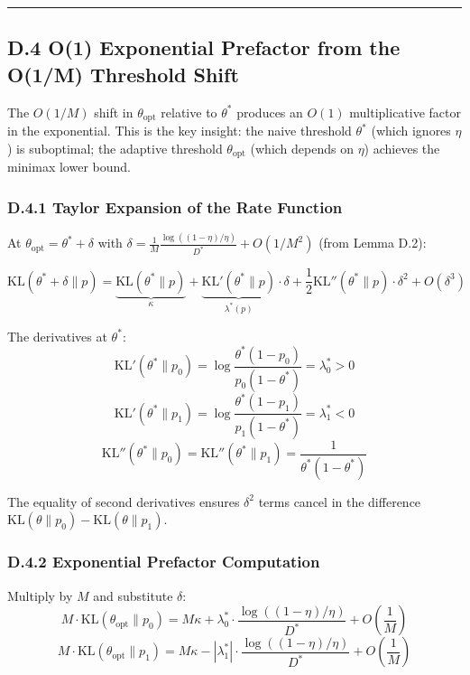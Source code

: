 \documentclass[
  12pt,
]{ctexart}
\begin{document}
\begin{center}\rule{0.5\linewidth}{0.5pt}\end{center}

\subsection{D.4 O(1) Exponential Prefactor from the O(1/M) Threshold
Shift}\label{d.4-o1-exponential-prefactor-from-the-o1m-threshold-shift}

The \(O(1/M)\) shift in \(\theta_{\text{opt}}\) relative to \(\theta^*\)
produces an \(O(1)\) multiplicative factor in the exponential. This is
the key insight: the naive threshold \(\theta^*\) (which ignores
\(\eta\)) is suboptimal; the adaptive threshold \(\theta_{\text{opt}}\)
(which depends on \(\eta\)) achieves the minimax lower bound.

\subsubsection{D.4.1 Taylor Expansion of the Rate
Function}\label{d.4.1-taylor-expansion-of-the-rate-function}

At \(\theta_{\text{opt}} = \theta^* + \delta\) with
\(\delta = \frac{1}{M}\frac{\log((1-\eta)/\eta)}{D^*} + O(1/M^2)\) (from
Lemma D.2):

\[\text{KL}(\theta^* + \delta \| p) = \underbrace{\text{KL}(\theta^* \| p)}_{\kappa} + \underbrace{\text{KL}'(\theta^* \| p)}_{\lambda^*(p)} \cdot \delta + \frac{1}{2}\text{KL}''(\theta^* \| p) \cdot \delta^2 + O(\delta^3)\]

The derivatives at \(\theta^*\):
\[\text{KL}'(\theta^* \| p_0) = \log\frac{\theta^*(1-p_0)}{p_0(1-\theta^*)} = \lambda_0^* > 0\]
\[\text{KL}'(\theta^* \| p_1) = \log\frac{\theta^*(1-p_1)}{p_1(1-\theta^*)} = \lambda_1^* < 0\]
\[\text{KL}''(\theta^* \| p_0) = \text{KL}''(\theta^* \| p_1) = \frac{1}{\theta^*(1-\theta^*)}\]

The equality of second derivatives ensures \(\delta^2\) terms cancel in
the difference \(\text{KL}(\theta\|p_0) - \text{KL}(\theta\|p_1)\).

\subsubsection{D.4.2 Exponential Prefactor
Computation}\label{d.4.2-exponential-prefactor-computation}

Multiply by \(M\) and substitute \(\delta\):
\[M \cdot \text{KL}(\theta_{\text{opt}} \| p_0) = M\kappa + \lambda_0^* \cdot \frac{\log((1-\eta)/\eta)}{D^*} + O\left(\frac{1}{M}\right)\]
\[M \cdot \text{KL}(\theta_{\text{opt}} \| p_1) = M\kappa - |\lambda_1^*| \cdot \frac{\log((1-\eta)/\eta)}{D^*} + O\left(\frac{1}{M}\right)\]
\end{document}
